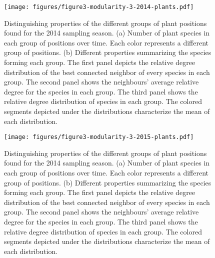 \documentclass[11pt, a4paper]{article}
\begin{document}
\begin{figure}[p]
  \centering
    \vspace{0.5cm}
    \texttt{[image: figures/figure3-modularity-3-2014-plants.pdf]}
	  \vspace{0.3cm}
	   \caption[Distinguishing properties of the different groups of plant positions found for the 2014 sampling season]{Distinguishing properties of the different groups of plant positions found for the 2014 sampling season. (a) Number of plant species in each group of positions over time. Each color represents a different group of positions. (b) Different properties summarizing the species forming each group. The first panel depicts the relative degree distribution of the best connected neighbor of every species in each group. The second panel shows the neighbours' average relative degree for the species in each group. The third panel shows the relative degree distribution of species in each group. The colored segments depicted under the distributions characterize the mean of each distribution.}
      \label{sfig:groups2014-plants}
\end{figure}

\clearpage

\begin{figure}[p]
  \centering
    \vspace{0.5cm}
    \texttt{[image: figures/figure3-modularity-3-2015-plants.pdf]}
	  \vspace{0.3cm}
	   \caption[Distinguishing properties of the different groups of plant positions found for the 2014 sampling season]{Distinguishing properties of the different groups of plant positions found for the 2014 sampling season. (a) Number of plant species in each group of positions over time. Each color represents a different group of positions. (b) Different properties summarizing the species forming each group. The first panel depicts the relative degree distribution of the best connected neighbor of every species in each group. The second panel shows the neighbours' average relative degree for the species in each group. The third panel shows the relative degree distribution of species in each group. The colored segments depicted under the distributions characterize the mean of each distribution.}
      \label{sfig:groups2015-plants}
\end{figure}

\clearpage
\end{document}
